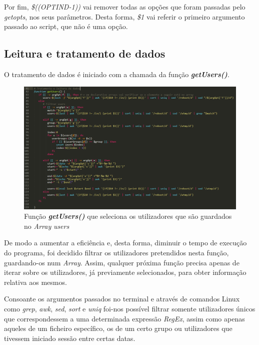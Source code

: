 \documentclass[10pt,portuguese]{article}
\begin{document}
\par Por fim, \textit{\$((OPTIND-1))} vai remover todas as opções que foram passadas pelo \textit{getopts}, nos seus parâmetros. Desta forma, \textit{\$1} vai referir o primeiro argumento passado ao script, que não é uma opção.


\clearpage 

\subsection{Leitura e tratamento de dados}
\newline
\par O tratamento de dados é iniciado com a chamada da função \textbf{\textit{getUsers()}}.
\begin{figure}[!h]
    \centering
    \includegraphics[width=\textwidth]{getUsers.PNG}
    \caption{Função \textbf{\textit{getUsers()}} que seleciona os utilizadores que são guardados no \textit{Array} \textit{users}}
\end{figure}
\par De modo a aumentar a eficiência e, desta forma, diminuir o tempo de execução do programa, foi decidido filtrar os utilizadores pretendidos nesta função, guardando-os num \textit{Array}. Assim, qualquer próxima função precisa apenas de iterar sobre os utilizadores, já previamente selecionados, para obter informação relativa aos mesmos.
\par Consoante os argumentos passados no terminal e através de comandos Linux como \textit{grep}, \textit{awk}, \textit{sed}, \textit{sort} e \textit{uniq} foi-nos possível filtrar somente utilizadores únicos que correspondessem a uma determinada expressão \textit{RegEx}, assim como apenas aqueles de um ficheiro específico, os de um certo grupo ou utilizadores que tivessem iniciado sessão entre certas datas.
\end{document}
